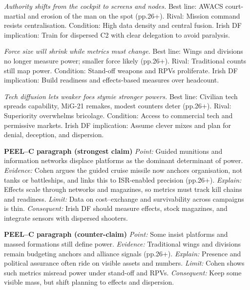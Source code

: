 \textit{Authority shifts from the cockpit to screens and nodes.} Best line: AWACS court-martial and erosion of the man on the spot (pp.26+). Rival: Mission command resists centralisation. Condition: High data density and central fusion. Irish DF implication: Train for dispersed C2 with clear delegation to avoid paralysis.

\textit{Force size will shrink while metrics must change.} Best line: Wings and divisions no longer measure power; smaller force likely (pp.26+). Rival: Traditional counts still map power. Condition: Stand-off weapons and RPVs proliferate. Irish DF implication: Build readiness and effects-based measures over headcount.

\textit{Tech diffusion lets weaker foes stymie stronger powers.} Best line: Civilian tech spreads capability, MiG-21 remakes, modest counters deter (pp.26+). Rival: Superiority overwhelms bricolage. Condition: Access to commercial tech and permissive markets. Irish DF implication: Assume clever mixes and plan for denial, deception, and dispersion.

\textbf{PEEL–C paragraph (strongest claim)}
\textit{Point:} Guided munitions and information networks displace platforms as the dominant determinant of power.
\textit{Evidence:} Cohen argues the guided cruise missile now anchors organisation, not tanks or battleships, and links this to ISR-enabled precision (pp.26+).
\textit{Explain:} Effects scale through networks and magazines, so metrics must track kill chains and readiness.
\textit{Limit:} Data on cost–exchange and survivability across campaigns is thin.
\textit{Consequent:} Irish DF should measure effects, stock magazines, and integrate sensors with dispersed shooters.

\textbf{PEEL–C paragraph (counter-claim)}
\textit{Point:} Some insist platforms and massed formations still define power.
\textit{Evidence:} Traditional wings and divisions remain budgeting anchors and alliance signals (pp.26+).
\textit{Explain:} Presence and political assurance often ride on visible assets and numbers.
\textit{Limit:} Cohen shows such metrics misread power under stand-off and RPVs.
\textit{Consequent:} Keep some visible mass, but shift planning to effects and dispersion.


